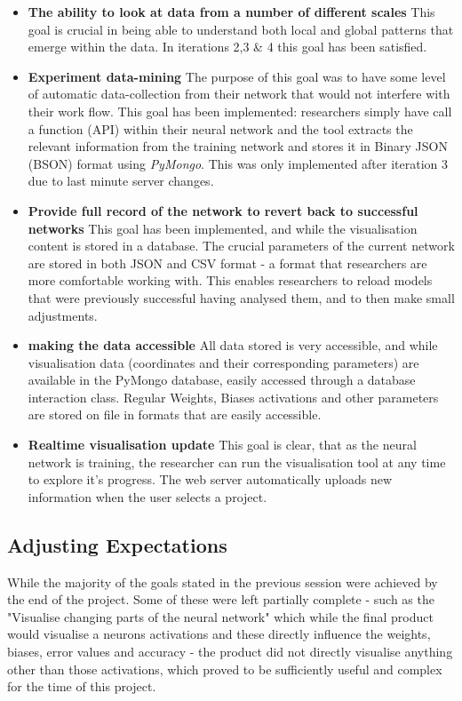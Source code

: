 \documentclass[a4paper,11pt,titlepage]{article}
\begin{document}
\begin{itemize}
			\item \textbf{The ability to look at data from a number of different scales} 
			This goal is crucial in being able to understand both local and global patterns that emerge within the data. In iterations 2,3 \& 4 this goal has been satisfied.
			\item \textbf{Experiment data-mining}
			The purpose of this goal was to have some level of automatic data-collection from their network that would not interfere with their work flow. This goal has been implemented: researchers simply have call a function (API) within their neural network and the tool extracts the relevant information from the training network and stores it in Binary JSON (BSON) format using \textit{PyMongo}. This was only implemented after iteration 3 due to last minute server changes.
			\item \textbf{Provide full record of the network to revert back to successful networks}
			This goal has been implemented, and while the visualisation content is stored in a database. The crucial parameters of the current network are stored in both JSON and CSV format - a format that researchers are more comfortable working with. This enables researchers to reload models that were previously successful having analysed them, and to then make small adjustments.
			\item \textbf{making the data accessible}
			All data stored is very accessible, and while visualisation data (coordinates and their corresponding parameters) are available in the PyMongo database, easily accessed through a database interaction class. Regular Weights, Biases activations and other parameters are stored on file in formats that are easily accessible.
			\item \textbf{Realtime visualisation update} 
			This goal is clear, that as the neural network is training, the researcher can run the visualisation tool at any time to explore it's progress. The web server automatically uploads new information when the user selects a project.

	\end{itemize}	
	\subsection{Adjusting Expectations}
	While the majority of the goals stated in the previous session were achieved by the end of the project. Some of these were left partially complete - such as the "Visualise changing parts of the neural network" which while the final product would visualise a neurons activations and these directly influence the weights, biases, error values and accuracy - the product did not directly visualise anything other than those activations, which proved to be sufficiently useful and complex for the time of this project.
		
\end{document}
